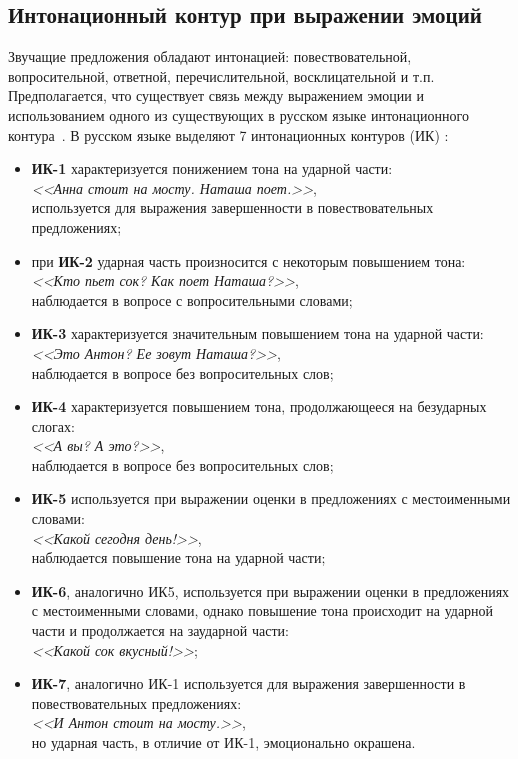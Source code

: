 \subsection{Интонационный контур при выражении эмоций}
Звучащие предложения обладают интонацией: повествовательной, вопросительной, ответной, перечислительной, восклицательной и т.п. Предполагается, что существует связь между выражением эмоции и использованием одного из существующих в русском языке интонационного контура~\cite{intonation}. В русском языке выделяют 7 интонационных контуров (ИК) \cite{ik}:
\begin{itemize}
	\item \textbf{ИК-1} характеризуется понижением тона на ударной части:\\
	\textit{<<Анна стоит на мосту. Наташа поет.>>},\\
	используется для выражения завершенности в повествовательных предложениях;
	\item при \textbf{ИК-2} ударная часть произносится с некоторым повышением тона:\\
	\textit{<<Кто пьет сок? Как поет Наташа?>>},\\
	наблюдается в вопросе с вопросительными словами;
	\item \textbf{ИК-3} характеризуется значительным повышением тона на ударной части:\\
	\textit{<<Это Антон? Ее зовут Наташа?>>},\\
	наблюдается в вопросе без вопросительных слов;
	\item \textbf{ИК-4} характеризуется повышением тона, продолжающееся на безударных слогах:\\
	\textit{<<А вы? А это?>>},\\
	наблюдается в вопросе без вопросительных слов;
	\item \textbf{ИК-5} используется при выражении оценки в предложениях с местоименными словами:\\
	\textit{<<Какой сегодня день!>>},\\
	наблюдается повышение тона на ударной части;
	\item \textbf{ИК-6}, аналогично ИК5, используется при выражении оценки в предложениях с местоименными словами, однако повышение тона происходит на ударной части и продолжается на заударной части:\\
	\textit{<<Какой сок вкусный!>>};
	\item \textbf{ИК-7}, аналогично ИК-1 используется для выражения завершенности в повествовательных предложениях:\\
	\textit{<<И Антон стоит на мосту.>>},\\
	но ударная часть, в отличие от ИК-1, эмоционально окрашена.
\end{itemize}
